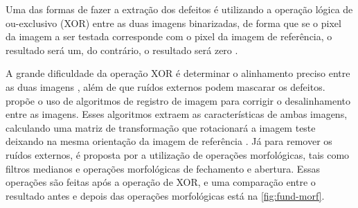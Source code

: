 Uma das formas de fazer a extração dos defeitos é utilizando a operação lógica de ou-exclusivo (XOR) entre as duas imagens binarizadas, de forma que se o pixel da imagem a ser testada corresponde com o pixel da imagem de referência, o resultado será um, do contrário, o resultado será zero \cite{ref:Huang-et-al}.

A grande dificuldade da operação XOR é determinar o alinhamento preciso entre as duas imagens \cite{ref:Ding-et-al}, além de que ruídos externos podem mascarar os defeitos.  propõe o uso de algoritmos de registro de imagem para corrigir o desalinhamento entre as imagens. Esses algoritmos extraem as características de ambas imagens, calculando uma matriz de transformação que rotacionará a imagem teste deixando na mesma orientação da imagem de referência \cite{ref:Huang-et-al}. Já para remover os ruídos externos, é proposta por  a utilização de operações morfológicas, tais como filtros medianos e operações morfológicas de fechamento e abertura. Essas operações são feitas após a operação de XOR, e uma comparação entre o resultado antes e depois das operações morfológicas está na \autoref{fig:fund-morf}.

